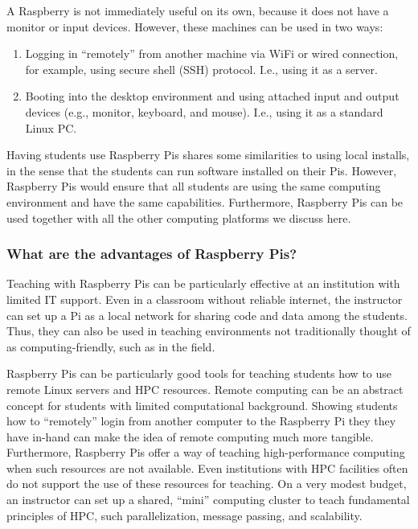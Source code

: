A Raspberry is not immediately useful on its own, because it does not have a
monitor or input devices.
However, these machines can be used in two ways:
\begin{enumerate}
    \item Logging in ``remotely'' from another machine via WiFi or wired
        connection, for example, using secure shell (SSH) protocol.
        I.e., using it as a server. 
    \item Booting into the desktop environment and using attached input and
        output devices (e.g., monitor, keyboard, and mouse).
        I.e., using it as a standard Linux PC. 
\end{enumerate}
Having students use Raspberry Pis shares some similarities to using local
installs, in the sense that the students can run software installed on their
Pis.
However, Raspberry Pis would ensure that all students are using the same
computing environment and have the same capabilities.
Furthermore, Raspberry Pis can be used together with all the other computing platforms we
discuss here.

\subsubsection{What are the advantages of Raspberry Pis?}

Teaching with Raspberry Pis can be particularly effective at an institution
with limited IT support.
Even in a classroom without reliable internet, the instructor can set up a Pi
as a local network for sharing code and data among the students.
Thus, they can also be used in teaching environments not traditionally thought
of as computing-friendly, such as in the field.

Raspberry Pis can be particularly good tools for teaching students how
to use remote Linux servers and HPC resources.
Remote computing can be an abstract concept for students with limited
computational background.
Showing students how to ``remotely'' login from another computer to the
Raspberry Pi they they have in-hand can make the idea of remote computing much
more tangible.
Furthermore, Raspberry Pis offer a way of teaching high-performance
computing when such resources are not available.
Even institutions with HPC facilities often do not support the use of these
resources for teaching.
On a very modest budget, an instructor can set up a shared, ``mini''
computing cluster to teach fundamental principles of HPC, such parallelization,
message passing, and scalability.


